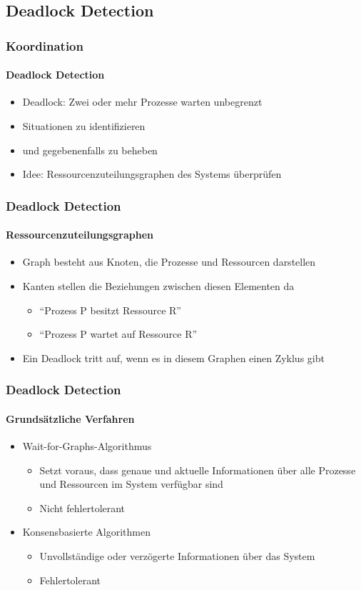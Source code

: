 \subsection{Deadlock Detection}
\begin{frame}
  \frametitle{Koordination}
  \framesubtitle{Deadlock Detection}
  \begin{itemize}
    \item Deadlock: Zwei oder mehr Prozesse warten unbegrenzt
    \item Situationen zu identifizieren 
    \item und gegebenenfalls zu beheben
    \item Idee: Ressourcenzuteilungsgraphen des Systems überprüfen
  \end{itemize}
\end{frame}

\begin{frame}
  \frametitle{Deadlock Detection}
  \framesubtitle{Ressourcenzuteilungsgraphen}
  \begin{itemize}
    \item Graph besteht aus Knoten, die Prozesse und Ressourcen darstellen
    \item Kanten stellen die Beziehungen zwischen diesen Elementen da
    \begin{itemize}
      \item \enquote{Prozess P besitzt Ressource R}
      \item \enquote{Prozess P wartet auf Ressource R}
    \end{itemize}  
    \item Ein Deadlock tritt auf, wenn es in diesem Graphen einen Zyklus gibt
  \end{itemize}
\end{frame}

\begin{frame}
  \frametitle{Deadlock Detection}
  \framesubtitle{Grundsätzliche Verfahren}
  \begin{itemize}
    \item Wait-for-Graphs-Algorithmus
    \begin{itemize}
      \item Setzt voraus, dass genaue und aktuelle Informationen über alle Prozesse und Ressourcen im System verfügbar sind
      \item Nicht fehlertolerant
    \end{itemize}  
    \item Konsensbasierte Algorithmen 
    \begin{itemize}
      \item Unvollständige oder verzögerte Informationen über das System
      \item Fehlertolerant 
    \end{itemize}  
  \end{itemize}
\end{frame}